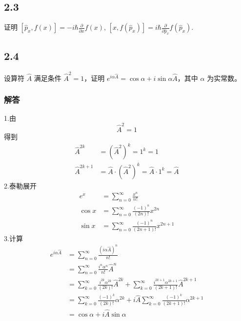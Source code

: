 \newpage
\subsection{2.3}
证明 $[\hat{p}_x, f(x)] = -i\hbar \frac{\partial}{\partial x} f(x)$, $[x, f(\hat{p}_x)] = i\hbar \frac{\partial}{\partial \hat{p}_x} f(\hat{p}_x)$.

\newpage
\subsection{2.4}
设算符 $\hat{A}$ 满足条件 $\hat{A}^2 = 1$，证明 $e^{i\alpha \hat{A}} = \cos \alpha + i \sin \alpha \hat{A}$，其中 $\alpha$ 为实常数。

\subsubsection{解答}
1.由
\begin{equation}
    \hat{A}^2=1
\end{equation}
得到
\begin{equation}
    \begin{aligned}
        \hat{A}^{2k}&=(\hat{A}^2)^k=1^k=1
\\
\hat{A}^{2k+1}&=\hat{A}\cdot (\hat{A}^2)^k=\hat{A}\cdot 1^k=\hat{A}
    \end{aligned}
\end{equation}
2.泰勒展开
\begin{equation}
    \begin{aligned}
        e^x&=\sum_{n=0}^{\infty}{\frac{x^n}{n!}}
\\
\cos x&=\sum_{n=0}^{\infty}{\frac{\left( -1 \right) ^n}{\left( 2n \right) !}}x^{2n}
\\
\sin x&=\sum_{n=0}^{\infty}{\frac{\left( -1 \right) ^n}{\left( 2n+1 \right) !}}x^{2n+1}
    \end{aligned}
\end{equation}
3.计算
\begin{equation}
    \begin{aligned}
        e^{i\alpha \hat{A}}&=\sum_{n=0}^{\infty}{\frac{(i\alpha \hat{A})^n}{n!}}
\\
&=\sum_{n=0}^{\infty}{\frac{i^n\alpha ^n}{n!}}\hat{A}^n
\\
&=\sum_{k=0}^{\infty}{\frac{i^{2k}\alpha ^{2k}}{\left( 2k \right) !}}\hat{A}^{2k}+\sum_{k=0}^{\infty}{\frac{i^{2k+1}\alpha ^{2k+1}}{\left( 2k+1 \right) !}}\hat{A}^{2k+1}
\\
&=\sum_{k=0}^{\infty}{\frac{\left( -1 \right) ^k}{\left( 2k \right) !}}\alpha ^{2k}+i\hat{A}\sum_{k=0}^{\infty}{\frac{\left( -1 \right) ^k}{\left( 2k+1 \right) !}}\alpha ^{2k+1}
\\
&=\cos \alpha +i\hat{A}\sin \alpha 
    \end{aligned}
\end{equation}


